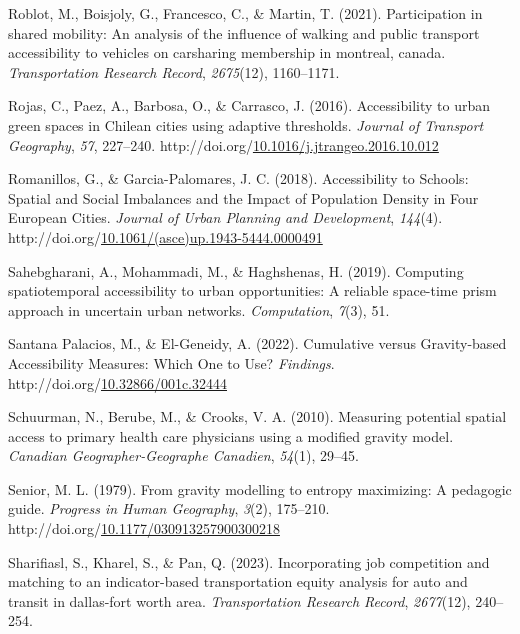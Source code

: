 \documentclass[
11pt, %
oneside, %
english, %
singlespacing, %
]{macthesis} %
\newlength{\cslhangindent}
\newenvironment{CSLReferences}[2] %
{\begin{list}{}{%
	\setlength{\itemindent}{0pt}
	\setlength{\leftmargin}{0pt}
	\setlength{\parsep}{0pt}
	\ifodd #1
	\setlength{\leftmargin}{\cslhangindent}
	\setlength{\itemindent}{-1\cslhangindent}
	\fi
	\setlength{\itemsep}{#2\baselineskip}}}
{\end{list}}
\begin{document}
\begin{CSLReferences}{1}{0}
Roblot, M., Boisjoly, G., Francesco, C., \& Martin, T. (2021). Participation in shared mobility: An analysis of the influence of walking and public transport accessibility to vehicles on carsharing membership in montreal, canada. \emph{Transportation Research Record}, \emph{2675}(12), 1160--1171.

Rojas, C., Paez, A., Barbosa, O., \& Carrasco, J. (2016). Accessibility to urban green spaces in {Chilean} cities using adaptive thresholds. \emph{Journal of Transport Geography}, \emph{57}, 227--240. http://doi.org/\href{https://doi.org/10.1016/j.jtrangeo.2016.10.012}{10.1016/j.jtrangeo.2016.10.012}

Romanillos, G., \& Garcia-Palomares, J. C. (2018). Accessibility to {Schools}: {Spatial} and {Social} {Imbalances} and the {Impact} of {Population} {Density} in {Four} {European} {Cities}. \emph{Journal of Urban Planning and Development}, \emph{144}(4). http://doi.org/\href{https://doi.org/10.1061/(asce)up.1943-5444.0000491}{10.1061/(asce)up.1943-5444.0000491}

Sahebgharani, A., Mohammadi, M., \& Haghshenas, H. (2019). Computing spatiotemporal accessibility to urban opportunities: A reliable space-time prism approach in uncertain urban networks. \emph{Computation}, \emph{7}(3), 51.

Santana Palacios, M., \& El-Geneidy, A. (2022). Cumulative versus Gravity-based Accessibility Measures: Which One to Use? \emph{Findings}. http://doi.org/\href{https://doi.org/10.32866/001c.32444}{10.32866/001c.32444}

Schuurman, N., Berube, M., \& Crooks, V. A. (2010). Measuring potential spatial access to primary health care physicians using a modified gravity model. \emph{Canadian Geographer-Geographe Canadien}, \emph{54}(1), 29--45.

Senior, M. L. (1979). From gravity modelling to entropy maximizing: A pedagogic guide. \emph{Progress in Human Geography}, \emph{3}(2), 175--210. http://doi.org/\href{https://doi.org/10.1177/030913257900300218}{10.1177/030913257900300218}

Sharifiasl, S., Kharel, S., \& Pan, Q. (2023). Incorporating job competition and matching to an indicator-based transportation equity analysis for auto and transit in dallas-fort worth area. \emph{Transportation Research Record}, \emph{2677}(12), 240--254.


\end{CSLReferences}
\end{document}
